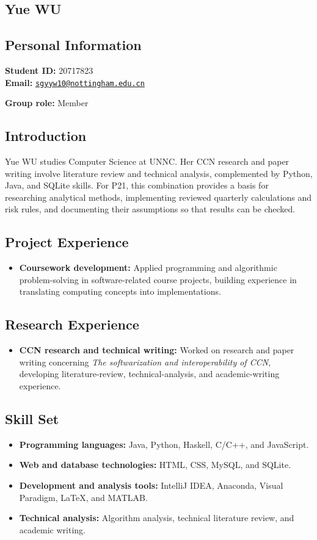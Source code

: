 \documentclass[a4paper,12pt]{article}
\newcommand{\PersonalInformation}[2]{%
  \subsection*{Personal Information}
  \if\relax\detokenize{#1}\relax\else
  \noindent\textbf{Student ID:} #1\\
  \fi
  \textbf{Email:} #2\par
}
\begin{document}
\subsection{Yue WU}
\PersonalInformation{20717823}{\href{mailto:sgyyw10@nottingham.edu.cn}{\nolinkurl{sgyyw10@nottingham.edu.cn}}}
\noindent\textbf{Group role:} Member\par

\subsection*{Introduction}
Yue WU studies Computer Science at UNNC. Her CCN research and paper writing involve literature review and technical analysis, complemented by Python, Java, and SQLite skills. For P21, this combination provides a basis for researching analytical methods, implementing reviewed quarterly calculations and risk rules, and documenting their assumptions so that results can be checked.

\subsection*{Project Experience}
\begin{itemize}
  \item \textbf{Coursework development:} Applied programming and algorithmic problem-solving in software-related course projects, building experience in translating computing concepts into implementations.
\end{itemize}

\subsection*{Research Experience}
\begin{itemize}
  \item \textbf{CCN research and technical writing:} Worked on research and paper writing concerning \emph{The softwarization and interoperability of CCN}, developing literature-review, technical-analysis, and academic-writing experience.
\end{itemize}

\subsection*{Skill Set}
\begin{itemize}
  \item \textbf{Programming languages:} Java, Python, Haskell, C/C++, and JavaScript.
  \item \textbf{Web and database technologies:} HTML, CSS, MySQL, and SQLite.
  \item \textbf{Development and analysis tools:} IntelliJ IDEA, Anaconda, Visual Paradigm, LaTeX, and MATLAB.
  \item \textbf{Technical analysis:} Algorithm analysis, technical literature review, and academic writing.
\end{itemize}
\end{document}
